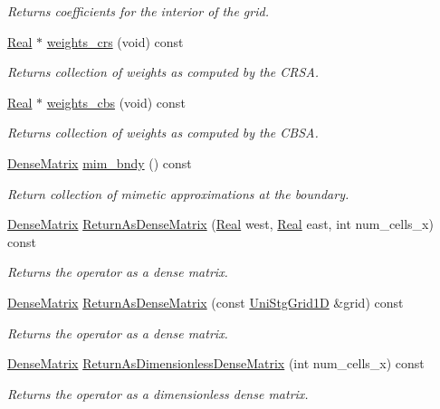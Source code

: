 \begin{DoxyCompactItemize}
\begin{DoxyCompactList}\small\item\em Returns coefficients for the interior of the grid. \end{DoxyCompactList}\item 
\hyperlink{group__c01-roots_gac080bbbf5cbb5502c9f00405f894857d}{Real} $\ast$ \hyperlink{classmtk_1_1Grad1D_ae5f15d8986a5680b6a1c120283c6cc5e}{weights\+\_\+crs} (void) const 
\begin{DoxyCompactList}\small\item\em Returns collection of weights as computed by the C\+R\+S\+A. \end{DoxyCompactList}\item 
\hyperlink{group__c01-roots_gac080bbbf5cbb5502c9f00405f894857d}{Real} $\ast$ \hyperlink{classmtk_1_1Grad1D_ad11927d8f9f1ca0089aaa2be7094f7f3}{weights\+\_\+cbs} (void) const 
\begin{DoxyCompactList}\small\item\em Returns collection of weights as computed by the C\+B\+S\+A. \end{DoxyCompactList}\item 
\hyperlink{classmtk_1_1DenseMatrix}{Dense\+Matrix} \hyperlink{classmtk_1_1Grad1D_ab25e1d064a5a00fbe3777e65fd5750c0}{mim\+\_\+bndy} () const 
\begin{DoxyCompactList}\small\item\em Return collection of mimetic approximations at the boundary. \end{DoxyCompactList}\item 
\hyperlink{classmtk_1_1DenseMatrix}{Dense\+Matrix} \hyperlink{classmtk_1_1Grad1D_a77b2eddbe4ab03f469306c604d505b1a}{Return\+As\+Dense\+Matrix} (\hyperlink{group__c01-roots_gac080bbbf5cbb5502c9f00405f894857d}{Real} west, \hyperlink{group__c01-roots_gac080bbbf5cbb5502c9f00405f894857d}{Real} east, int num\+\_\+cells\+\_\+x) const 
\begin{DoxyCompactList}\small\item\em Returns the operator as a dense matrix. \end{DoxyCompactList}\item 
\hyperlink{classmtk_1_1DenseMatrix}{Dense\+Matrix} \hyperlink{classmtk_1_1Grad1D_a871a3b31e257b04d5e303b3211df3a73}{Return\+As\+Dense\+Matrix} (const \hyperlink{classmtk_1_1UniStgGrid1D}{Uni\+Stg\+Grid1\+D} \&grid) const 
\begin{DoxyCompactList}\small\item\em Returns the operator as a dense matrix. \end{DoxyCompactList}\item 
\hyperlink{classmtk_1_1DenseMatrix}{Dense\+Matrix} \hyperlink{classmtk_1_1Grad1D_ab07e6a15edca32534ae3d1a8ccaf1c42}{Return\+As\+Dimensionless\+Dense\+Matrix} (int num\+\_\+cells\+\_\+x) const 
\begin{DoxyCompactList}\small\item\em Returns the operator as a dimensionless dense matrix. \end{DoxyCompactList}\end{DoxyCompactItemize}
